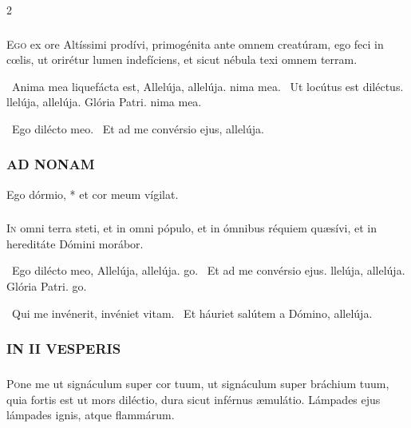 \documentclass[9pt,twoside]{extarticle}
\begin{document}
\begin{multicols}{2}
\smallskip
\subsubsection*{\normalfont {}}
\lettrine{E}{go} ex ore Altíssimi prodívi, primogénita ante omnem creatúram, ego feci in cœlis, ut orirétur lumen indefíciens, et sicut nébula texi omnem terram.

~Anima mea liquefácta est, \textred{*} Allelúja, allelúja. nima mea.
~Ut locútus est diléctus. llelúja, allelúja.
Glória Patri. nima mea.

~Ego dilécto meo. ~Et ad me convérsio ejus, allelúja.

\subsubsection*{\center \normalfont \textsc{AD NONAM}}
 Ego dórmio, * et cor meum vígilat.

\smallskip
\subsubsection*{\normalfont {}}
\lettrine{I}{n} omni terra steti, et in omni pópulo, et in ómnibus réquiem quæsívi, et in hereditáte Dómini morábor.

~Ego dilécto meo, \textred{*} Allelúja, allelúja. go.
~Et ad me convérsio ejus. llelúja, allelúja.
Glória Patri. go.

~Qui me invénerit, invéniet vitam. ~Et háuriet salútem a Dómino, allelúja.

\subsubsection*{\center \normalfont \textsc{IN II VESPERIS}}
{\small {}}

\subsubsection*{\normalfont {}}
\lettrine{P}{o}ne me ut signáculum super cor tuum, ut signáculum super bráchium tuum, quia fortis est ut mors diléctio, dura sicut inférnus æmulátio. Lámpades ejus lámpades ignis, atque flammárum.


\end{multicols}
\end{document}
